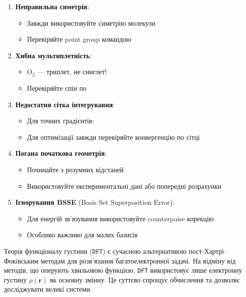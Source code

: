 \begin{enumerate}
    \item \textbf{Неправильна симетрія}:
    \begin{itemize}
        \item Завжди використовуйте симетрію молекули
        \item Перевіряйте point group командою 
    \end{itemize}

    \item \textbf{Хибна мультиплетність}:
    \begin{itemize}
        \item O$_2$ --- триплет, не синглет!
        \item Перевіряйте спін по 
    \end{itemize}

    \item \textbf{Недостатня сітка інтегрування}:
    \begin{itemize}
        \item Для точних градієнтів: 
        \item Для оптимізації завжди перевіряйте конвергенцію по сітці
    \end{itemize}

    \item \textbf{Погана початкова геометрія}:
    \begin{itemize}
        \item Починайте з розумних відстаней
        \item Використовуйте експериментальні дані або попередні розрахунки
    \end{itemize}

    \item \textbf{Ігнорування BSSE} (Basis Set Superposition Error):
    \begin{itemize}
        \item Для енергій зв'язування використовуйте counterpoise корекцію
        \item Особливо важливо для малих базисів
    \end{itemize}
\end{enumerate}



Теорія функціоналу густини (\texttt{DFT}) є сучасною альтернативою
пост-Хартрі--Фоківським методам для розв’язання багатоелектронної задачі.
На відміну від методів, що оперують хвильовою функцією, \texttt{DFT}
використовує лише електронну густину $\rho(\mathbf{r})$ як основну змінну.
Це суттєво спрощує обчислення та дозволяє досліджувати великі системи.

